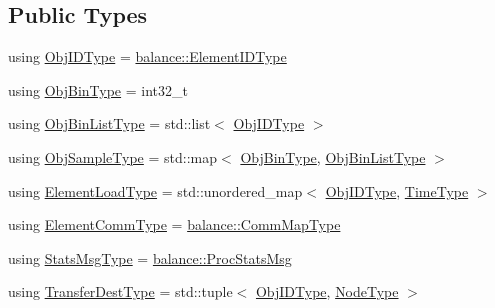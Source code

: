\subsection*{Public Types}
\begin{DoxyCompactItemize}
\item 
using \hyperlink{structvt_1_1vrt_1_1collection_1_1lb_1_1_base_l_b_a15a2f756b59c8c2437985206b32aa403}{Obj\+I\+D\+Type} = \hyperlink{namespacevt_1_1vrt_1_1collection_1_1balance_a14c8d2c972f2913aa3f1636e5be0a120}{balance\+::\+Element\+I\+D\+Type}
\item 
using \hyperlink{structvt_1_1vrt_1_1collection_1_1lb_1_1_base_l_b_ae0bff8fcf0dec0abc1d81836cf1d060a}{Obj\+Bin\+Type} = int32\+\_\+t
\item 
using \hyperlink{structvt_1_1vrt_1_1collection_1_1lb_1_1_base_l_b_ab29c64ca66a928f34cf638dad6163f80}{Obj\+Bin\+List\+Type} = std\+::list$<$ \hyperlink{structvt_1_1vrt_1_1collection_1_1lb_1_1_base_l_b_a15a2f756b59c8c2437985206b32aa403}{Obj\+I\+D\+Type} $>$
\item 
using \hyperlink{structvt_1_1vrt_1_1collection_1_1lb_1_1_base_l_b_a331d7da5bbf2883238427d86b54ddd7b}{Obj\+Sample\+Type} = std\+::map$<$ \hyperlink{structvt_1_1vrt_1_1collection_1_1lb_1_1_base_l_b_ae0bff8fcf0dec0abc1d81836cf1d060a}{Obj\+Bin\+Type}, \hyperlink{structvt_1_1vrt_1_1collection_1_1lb_1_1_base_l_b_ab29c64ca66a928f34cf638dad6163f80}{Obj\+Bin\+List\+Type} $>$
\item 
using \hyperlink{structvt_1_1vrt_1_1collection_1_1lb_1_1_base_l_b_aa286d31a0820a8fc9218ccb858368fca}{Element\+Load\+Type} = std\+::unordered\+\_\+map$<$ \hyperlink{structvt_1_1vrt_1_1collection_1_1lb_1_1_base_l_b_a15a2f756b59c8c2437985206b32aa403}{Obj\+I\+D\+Type}, \hyperlink{namespacevt_a876a9d0cd5a952859c72de8a46881442}{Time\+Type} $>$
\item 
using \hyperlink{structvt_1_1vrt_1_1collection_1_1lb_1_1_base_l_b_ac3f8560bfe41aa593eb7d5bd1241cc4c}{Element\+Comm\+Type} = \hyperlink{namespacevt_1_1vrt_1_1collection_1_1balance_aa50d4cbbfa3c643e7303fc6e08f411fb}{balance\+::\+Comm\+Map\+Type}
\item 
using \hyperlink{structvt_1_1vrt_1_1collection_1_1lb_1_1_base_l_b_acebfe78fa7dbafe6e9e5e5e514cda278}{Stats\+Msg\+Type} = \hyperlink{structvt_1_1vrt_1_1collection_1_1balance_1_1_proc_stats_msg}{balance\+::\+Proc\+Stats\+Msg}
\item 
using \hyperlink{structvt_1_1vrt_1_1collection_1_1lb_1_1_base_l_b_add886785f64ea725005f1263fd1393be}{Transfer\+Dest\+Type} = std\+::tuple$<$ \hyperlink{structvt_1_1vrt_1_1collection_1_1lb_1_1_base_l_b_a15a2f756b59c8c2437985206b32aa403}{Obj\+I\+D\+Type}, \hyperlink{namespacevt_a866da9d0efc19c0a1ce79e9e492f47e2}{Node\+Type} $>$

\end{DoxyCompactItemize}
